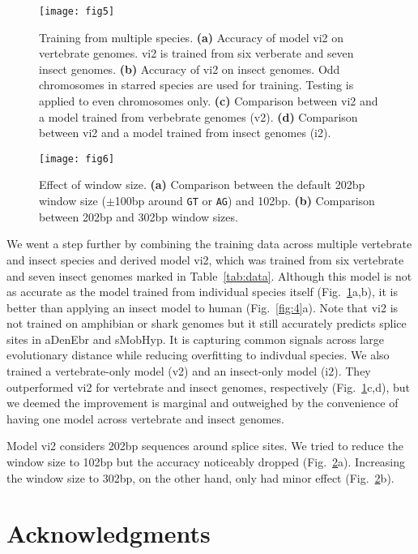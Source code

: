 \documentclass[webpdf,contemporary,large,namedate]{oup-authoring-template}%
\begin{document}
\begin{figure}[tb]
\texttt{[image: fig5]}
\caption{Training from multiple species.
{\bf (a)} Accuracy of model vi2 on vertebrate genomes. vi2 is trained from six verberate and seven insect genomes.
{\bf (b)} Accuracy of vi2 on insect genomes. Odd chromosomes in starred species are used for training.
Testing is applied to even chromosomes only.
{\bf (c)} Comparison between vi2 and a model trained from verbebrate genomes (v2).
{\bf (d)} Comparison between vi2 and a model trained from insect genomes (i2).}\label{fig:5}
\end{figure}

\begin{figure}[bt]
\texttt{[image: fig6]}
\caption{Effect of window size.
{\bf (a)} Comparison between the default 202bp window size ($\pm$100bp around {\tt GT} or {\tt AG}) and 102bp.
{\bf (b)} Comparison between 202bp and 302bp window sizes.}\label{fig:6}
\end{figure}

We went a step further by combining the training data across multiple vertebrate and insect species
and derived model vi2, which was trained from six vertebrate and seven insect genomes marked in Table~\ref{tab:data}.
Although this model is not as accurate as the model trained from individual species itself (Fig.~\ref{fig:5}a,b),
it is better than applying an insect model to human (Fig.~\ref{fig:4}a).
Note that vi2 is not trained on amphibian or shark genomes but it still accurately predicts splice sites in aDenEbr and sMobHyp.
It is capturing common signals across large evolutionary distance while reducing overfitting to indivdual species.
We also trained a vertebrate-only model (v2) and an insect-only model (i2).
They outperformed vi2 for vertebrate and insect genomes, respectively (Fig.~\ref{fig:5}c,d),
but we deemed the improvement is marginal and outweighed by the convenience
of having one model across vertebrate and insect genomes.

Model vi2 considers 202bp sequences around splice sites.
We tried to reduce the window size to 102bp but the accuracy noticeably dropped (Fig.~\ref{fig:6}a).
Increasing the window size to 302bp, on the other hand, only had minor effect (Fig.~\ref{fig:6}b).

\section*{Acknowledgments}
\end{document}
